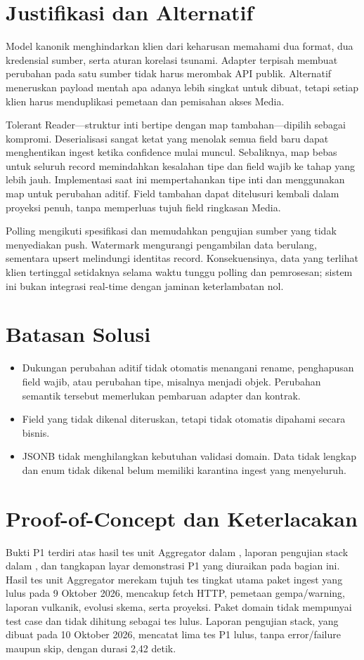 \section{Justifikasi dan Alternatif}
Model kanonik menghindarkan klien dari keharusan memahami dua format, dua kredensial sumber, serta aturan korelasi tsunami. Adapter terpisah membuat perubahan pada satu sumber tidak harus merombak API publik. Alternatif meneruskan payload mentah apa adanya lebih singkat untuk dibuat, tetapi setiap klien harus menduplikasi pemetaan dan pemisahan akses Media.

Tolerant Reader---struktur inti bertipe dengan map tambahan---dipilih sebagai kompromi. Deserialisasi sangat ketat yang menolak semua field baru dapat menghentikan ingest ketika confidence mulai muncul. Sebaliknya, map bebas untuk seluruh record memindahkan kesalahan tipe dan field wajib ke tahap yang lebih jauh. Implementasi saat ini mempertahankan tipe inti dan menggunakan map untuk perubahan aditif. Field tambahan dapat ditelusuri kembali dalam proyeksi penuh, tanpa memperluas tujuh field ringkasan Media.

Polling mengikuti spesifikasi dan memudahkan pengujian sumber yang tidak menyediakan push. Watermark mengurangi pengambilan data berulang, sementara upsert melindungi identitas record. Konsekuensinya, data yang terlihat klien tertinggal setidaknya selama waktu tunggu polling dan pemrosesan; sistem ini bukan integrasi real-time dengan jaminan keterlambatan nol.

\section{Batasan Solusi}
\begin{itemize}
\item Dukungan perubahan aditif tidak otomatis menangani rename, penghapusan field wajib, atau perubahan tipe, misalnya  menjadi objek. Perubahan semantik tersebut memerlukan pembaruan adapter dan kontrak.
\item Field yang tidak dikenal diteruskan, tetapi tidak otomatis dipahami secara bisnis.
\item JSONB tidak menghilangkan kebutuhan validasi domain. Data tidak lengkap dan enum tidak dikenal belum memiliki karantina ingest yang menyeluruh.
\end{itemize}

\section{Proof-of-Concept dan Keterlacakan}
Bukti P1 terdiri atas hasil tes unit Aggregator dalam , laporan pengujian stack dalam , dan tangkapan layar demonstrasi P1 yang diuraikan pada bagian ini. Hasil tes unit Aggregator merekam tujuh tes tingkat utama paket ingest yang lulus pada 9 Oktober 2026, mencakup fetch HTTP, pemetaan gempa/warning, laporan vulkanik, evolusi skema, serta proyeksi. Paket domain tidak mempunyai test case dan tidak dihitung sebagai tes lulus. Laporan pengujian stack, yang dibuat pada 10 Oktober 2026, mencatat lima tes P1 lulus, tanpa error/failure maupun skip, dengan durasi 2,42 detik.

